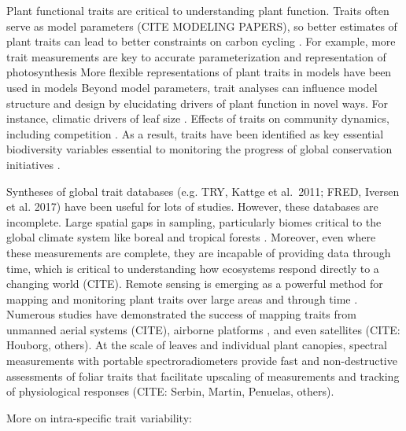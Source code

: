 Plant functional traits are critical to understanding plant function.
Traits often serve as model parameters (CITE MODELING PAPERS), so better estimates of plant traits can lead to better constraints on carbon cycling \cite{Dietze_2014,Dietze_2013_modeldata,LeBauer_2013_pecan}.
For example, more trait measurements are key to accurate parameterization and representation of photosynthesis \cite{rogers2017_roadmap,rogers2017_vcmax}
More flexible representations of plant traits in models have been used in models \cite{vanbodegom2012_beyond,verheijen2015_inclusion,vanbodegom2014_fully,verheijen2015_variation}
Beyond model parameters, trait analyses can influence model structure and design by elucidating drivers of plant function in novel ways.
For instance, climatic drivers of leaf size \cite{Wright_2017_leafsize}.
Effects of traits on community dynamics, including competition \cite{kunstler2016_competition,rosado2017_csr}.
As a result, traits have been identified as key essential biodiversity variables essential to monitoring the progress of global conservation initiatives \cite{tittensor2014_targets,pereira2013_ebv,geijzendorffer2015_ebv}.

Syntheses of global trait databases (e.g. TRY, Kattge et al.~2011; FRED, Iversen et al. 2017) \nocite{kattge2009_try,iversen2017_fred} have been useful for lots of studies.
However, these databases are incomplete.
Large spatial gaps in sampling, particularly biomes critical to the global climate system like boreal and tropical forests \cite{jetz2016_diversity}.
Moreover, even where these measurements are complete, they are incapable of providing data through time, which is critical to understanding how ecosystems respond directly to a changing world (CITE).
Remote sensing is emerging as a powerful method for mapping and monitoring plant traits over large areas and through time \cite{schneider2017_mapping,schimel2013_observing,schimel2015_observing,jetz2016_diversity}.
Numerous studies have demonstrated the success of mapping traits from unmanned aerial systems (CITE), airborne platforms \cite{schneider2017_mapping,asner2017_scale,singh2015_istraits}, and even satellites (CITE: Houborg, others).
At the scale of leaves and individual plant canopies, spectral measurements with portable spectroradiometers provide fast and non-destructive assessments of foliar traits  that facilitate upscaling of measurements and tracking of physiological responses (CITE: Serbin, Martin, Penuelas, others).

More on intra-specific trait variability:

